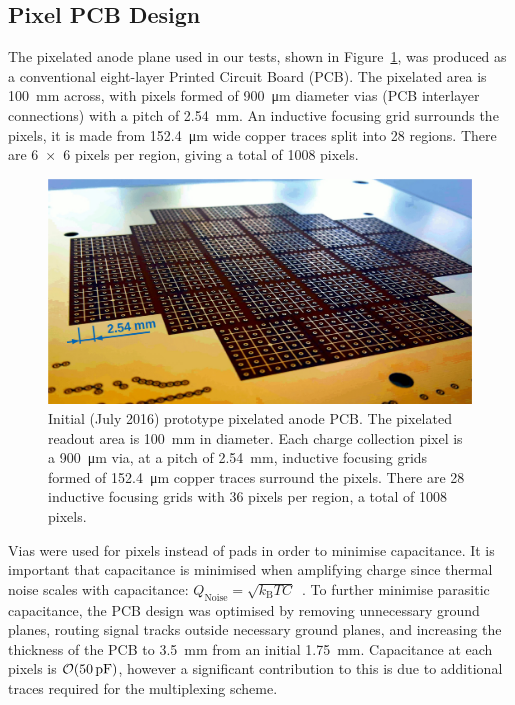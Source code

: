 \documentclass[a4paper]{article}
\begin{document}
\subsection{Pixel PCB Design} \label{sec:PCB}
 
The pixelated anode plane used in our tests, shown in Figure~\ref{fig:pixies}, was produced as a conventional eight-layer Printed Circuit Board (PCB). 
The pixelated area is \SI{100}{\milli\metre} across, with pixels formed of \SI{900}{\micro\metre} diameter vias (PCB interlayer connections) with a pitch of \SI{2.54}{\milli\metre}.
An inductive focusing grid surrounds the pixels, it is made from \SI{152.4}{\micro\metre} wide copper traces split into 28 regions.
There are \num{6 x 6} pixels per region, giving a total of 1008 pixels. 

\begin{figure}[!ht]
\centering
\includegraphics[width=0.65\linewidth]{Figures/pixies.jpg}
\caption{Initial (July 2016) prototype pixelated anode PCB. The pixelated readout area is \SI{100}{\milli\metre} in diameter.
Each charge collection pixel is a \SI{900}{\micro\metre} via, at a pitch of \SI{2.54}{\milli\metre}, inductive focusing grids formed of \SI{152.4}{\micro\metre} copper traces surround the pixels. There are 28 inductive focusing grids with 36 pixels per region, a total of 1008 pixels.}
\label{fig:pixies}
\end{figure}

Vias were used for pixels instead of pads in order to minimise capacitance.
It is important that capacitance is minimised when amplifying charge since thermal noise scales with capacitance: $Q_{\mathrm{Noise}}=\sqrt{k_{\mathrm{B}}TC}$~\cite{noise}. 
To further minimise parasitic capacitance, the PCB design was optimised by removing unnecessary ground planes, routing signal tracks outside necessary ground planes, and increasing the thickness of the PCB to \SI{3.5}{\milli\metre} from an initial \SI{1.75}{\milli\metre}. 
Capacitance at each pixels is $\order{\SI{50}{\pico\farad}}$, however a significant contribution to this is due to additional traces required for the multiplexing scheme.
\end{document}
